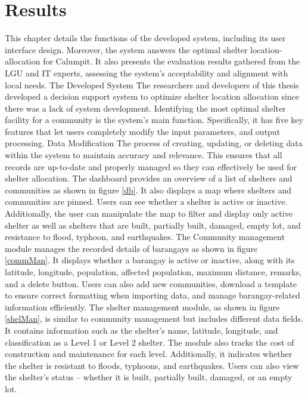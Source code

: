 \documentclass[12pt,a4paper,]{article}
\begin{document}
\section{Results}
	This chapter details the functions of the developed system, including its user interface design. Moreover, the system answers the optimal shelter location-allocation for Calumpit. It also presents the evaluation results gathered from the LGU and IT experts, assessing the system’s acceptability and alignment with local needs.
	The Developed System
	The researchers and developers of this thesis developed a decision support system to optimize shelter location allocation since there was a lack of system development. Identifying the most optimal shelter facility for a community is the system's main function. Specifically, it has five key features that let users completely modify the input parameters, and output processing.
	Data Modification
	The process of creating, updating, or deleting data within the system to maintain accuracy and relevance. This ensures that all records are up-to-date and properly managed so they can effectively be used for shelter allocation.
	The dashboard provides an overview of a list of shelters and communities as shown in figure \ref{db}. It also displays a map where shelters and communities are pinned. Users can see whether a shelter is active or inactive. Additionally, the user can manipulate the map to filter and display only active shelter as well as shelters that are built, partially built, damaged, empty lot, and resistance to flood, typhoon, and earthquakes.
	The Community management module manages the recorded details of barangays as shown in figure \ref{commMan}. It displays whether a barangay is active or inactive, along with its latitude, longitude, population, affected population, maximum distance, remarks, and a delete button. Users can also add new communities, download a template to ensure correct formatting when importing data, and manage barangay-related information efficiently.
	The shelter management module, as shown in figure \ref{shelMan}, is similar to community management but includes different data fields. It contains information such as the shelter’s name, latitude, longitude, and classification as a Level 1 or Level 2 shelter. The module also tracks the cost of construction and maintenance for each level. Additionally, it indicates whether the shelter is resistant to floods, typhoons, and earthquakes. Users can also view the shelter’s status – whether it is built, partially built, damaged, or an empty lot.
\end{document}
